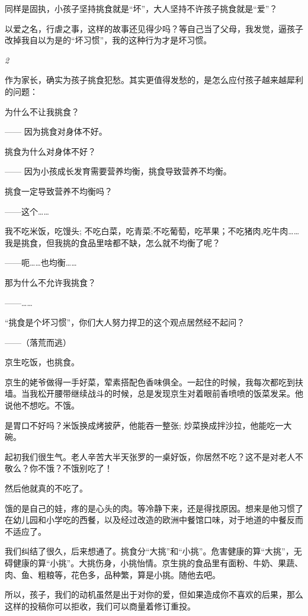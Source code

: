 \documentclass[twoside,openright,headings=optiontohead]{ctexbook} %
\begin{document}
{同样是固执，小孩子坚持挑食就是``坏''，大人坚持不许孩子挑食就是``爱''？

以爱之名，行虐之事，这样的故事还见得少吗？等自己当了父母，我发觉，逼孩子改掉我自以为是的``坏习惯''，我的这种行为才是坏习惯。

\emph{2}

作为家长，确实为孩子挑食犯愁。其实更值得发愁的，是怎么应付孩子越来越犀利的问题：

为什么不让我挑食？

------ 因为挑食对身体不好。

挑食为什么对身体不好？

------ 因为小孩成长发育需要营养均衡，挑食导致营养不均衡。

挑食一定导致营养不均衡吗？

------这个\ldots{}\ldots{}

我不吃米饭，吃馒头;
不吃白菜，吃青菜;不吃葡萄，吃苹果；不吃猪肉,吃牛肉\ldots{}\ldots{}我是挑食，但我挑的食品里啥都不缺，怎么就不均衡了呢？

------呃\ldots{}\ldots{}也均衡\ldots{}\ldots{}

那为什么不允许我挑食？

------\ldots{}\ldots{}

``挑食是个坏习惯''，你们大人努力捍卫的这个观点居然经不起问？

------（落荒而逃）

京生吃饭，也挑食。

京生的姥爷做得一手好菜，荤素搭配色香味俱全。一起住的时候，我每次都吃到扶墙。当我松开腰带继续战斗的时候，总是发现京生对着眼前香喷喷的饭菜发呆。他说他不想吃。不饿。

是胃口不好吗？米饭换成烤披萨，他能吞一整张;
炒菜换成拌沙拉，他能吃一大碗。

起初我们很生气。老人辛苦大半天张罗的一桌好饭，你居然不吃？这不是对老人不敬么？你不饿？不饿别吃了！

然后他就真的不吃了。

饿的是自己的娃，疼的是心头的肉。等冷静下来，还是得找原因。想来是他习惯了在幼儿园和小学吃的西餐，以及经过改造的欧洲中餐馆口味，对于地道的中餐反而不适应了。

我们纠结了很久，后来想通了。挑食分``大挑''和``小挑''。危害健康的算``大挑''，无碍健康的算``小挑''。大挑伤身，小挑怡情。京生挑的食品里有面粉、牛奶、果蔬、肉、鱼、粗粮等，花色多，品种繁，算是小挑。随他去吧。

所以，孩子，我们的动机虽然是出于对你的爱，但如果造成你不喜欢的后果，那么这样的投稿你可以拒收，我们可以商量着修订重投。

}
\end{document}
